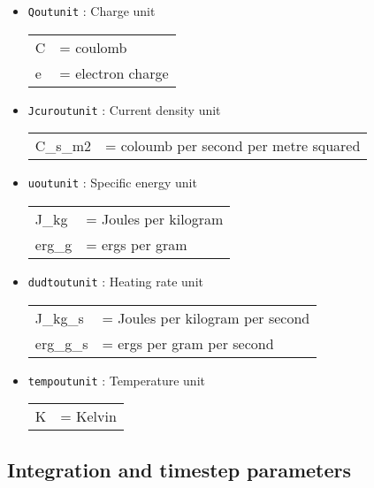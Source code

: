 \documentclass[a4paper]{article}
\newcommand{\var}[1]{\texttt{#1}}
\begin{document}
\begin{itemize}
\item \var{Qoutunit} : Charge unit \\
\begin{tabular}{ll}
C    & = coulomb \\
e    & = electron charge
\end{tabular}

\item \var{Jcuroutunit} : Current density unit \\
\begin{tabular}{ll}
C\_s\_m2    & = coloumb per second per metre squared
\end{tabular}

\item \var{uoutunit} : Specific energy unit \\
\begin{tabular}{ll}
J\_kg  & = Joules per kilogram \\
erg\_g & = ergs per gram
\end{tabular}

\item \var{dudtoutunit} : Heating rate unit \\
\begin{tabular}{ll}
J\_kg\_s  & = Joules per kilogram per second \\
erg\_g\_s & = ergs per gram per second
\end{tabular}

\item \var{tempoutunit} : Temperature unit \\
\begin{tabular}{ll}
K & = Kelvin
\end{tabular}

\end{itemize}



\subsection{Integration and timestep parameters}
\end{document}
